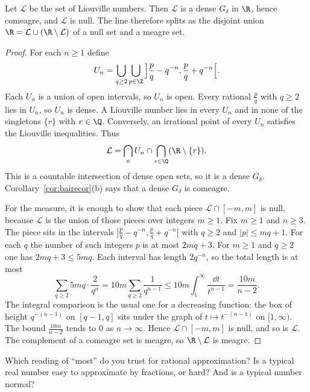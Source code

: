 \begin{theorem}\label{thm:liouville}
Let $\mathcal L$ be the set of Liouville numbers. Then $\mathcal L$ is a dense $G_\delta$ in $\R$, hence comeagre, and $\mathcal L$ is null. The line therefore splits as the disjoint union $\R=\mathcal L\cup(\R\setminus\mathcal L)$ of a null set and a meagre set.
\end{theorem}
\begin{proof}
For each $n\ge1$ define
\[U_n=\bigcup_{q\ge2}\bigcup_{p\in\Z}\,\Bigl]\frac pq-q^{-n},\frac pq+q^{-n}\Bigr[.\]
Each $U_n$ is a union of open intervals, so $U_n$ is open. Every rational $\frac pq$ with $q\ge2$ lies in $U_n$, so $U_n$ is dense. A Liouville number lies in every $U_n$ and in none of the singletons $\{r\}$ with $r\in\Q$. Conversely, an irrational point of every $U_n$ satisfies the Liouville inequalities. Thus
\[\mathcal L=\bigcap_n U_n\cap\bigcap_{r\in\Q}(\R\setminus\{r\}).\]
This is a countable intersection of dense open sets, so it is a dense $G_\delta$. Corollary~\ref{cor:bairecor}(b) says that a dense $G_\delta$ is comeagre.

For the measure, it is enough to show that each piece $\mathcal L\cap[-m,m]$ is null, because $\mathcal L$ is the union of those pieces over integers $m\ge1$. Fix $m\ge1$ and $n\ge3$. The piece sits in the intervals $\bigl]\frac pq-q^{-n},\frac pq+q^{-n}\bigr[$ with $q\ge2$ and $|p|\le mq+1$. For each $q$ the number of such integers $p$ is at most $2mq+3$. For $m\ge1$ and $q\ge2$ one has $2mq+3\le5mq$. Each interval has length $2q^{-n}$, so the total length is at most
\[\sum_{q\ge2}5mq\cdot\frac2{q^n}=10m\sum_{q\ge2}\frac1{q^{n-1}}\le10m\int_1^\infty\frac{\dd t}{t^{n-1}}=\frac{10m}{n-2}.\]
The integral comparison is the usual one for a decreasing function: the box of height $q^{-(n-1)}$ on $[q-1,q]$ sits under the graph of $t\mapsto t^{-(n-1)}$ on $[1,\infty)$. The bound $\frac{10m}{n-2}$ tends to $0$ as $n\to\infty$. Hence $\mathcal L\cap[-m,m]$ is null, and so is $\mathcal L$. The complement of a comeagre set is meagre, so $\R\setminus\mathcal L$ is meagre.
\end{proof}

\begin{think}
Which reading of ``most'' do you trust for rational approximation? Is a typical real number easy to approximate by fractions, or hard? And is a typical number normal?
\end{think}


